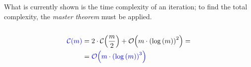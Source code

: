 \begin{frame}{\insertionseriessortrecursivecostframe}
\begin{columns}[c]
                \begin{column}{0.25\textwidth}
                    What is currently shown is the time complexity of an iteration; to find the total complexity, the \textit{master theorem} must be applied.
                \end{column}
            \end{columns}
        \end{frame}

        \begin{frame}{\insertionseriessortrecursivecostframe}
            \begin{align*}
                \textcolor{blue}{\mathcal{C}{\left(m\right)}} = & \; 2 \cdot \mathcal{C}{\left(\frac{m}{2}\right)} + \mathcal{O}{\left(m \cdot \left(\log{\left(m\right)}\right)^2\right)} = \\
                = & \; \textcolor{blue}{\mathcal{O}{\left(m \cdot \left(\log{\left(m\right)}\right)^3\right)}}
            \end{align*}
        \end{frame}

